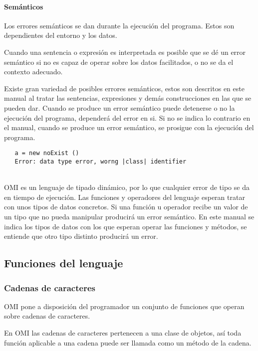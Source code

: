 \paragraph {Semánticos} 
Los errores semánticos se dan durante la ejecución del programa. Estos son dependientes del entorno y los datos. 

Cuando una sentencia o expresión es interpretada es posible que se dé un error semántico si no es capaz de operar sobre los datos
facilitados, o no se da el contexto adecuado. 

Existe gran variedad de posibles errores semánticos, estos son descritos en este manual al tratar las sentencias, expresiones y demás construcciones en las que se 
pueden dar. Cuando se produce un error semántico puede detenerse o no la ejecución del programa, dependerá del error en si. Si no se indica lo contrario en
el manual, cuando se produce un error semántico, se prosigue con la ejecución del programa. \\

\begin{lstlisting}
   a = new noExist ()
   Error: data type error, worng |class| identifier
\end{lstlisting}
\hfill\\ 

OMI es un lenguaje de tipado dinámico, por lo que cualquier error de tipo se da en tiempo de ejecución. Las funciones y operadores
del lenguaje esperan tratar con unos tipos de datos concretos. Si una función u operador recibe un valor de un tipo 
que no pueda manipular producirá un error semántico. En este manual se indica los tipos de datos con los que esperan operar 
las funciones y métodos, se entiende que otro tipo distinto producirá un error. 

\subsection{Funciones del lenguaje}
\subsubsection{Cadenas de caracteres}
OMI pone a disposición del programador un conjunto de funciones que operan sobre cadenas de caracteres.

En OMI las cadenas de caracteres pertenecen a una clase de objetos, así toda función aplicable a una cadena
puede ser llamada como un método de la cadena. 

